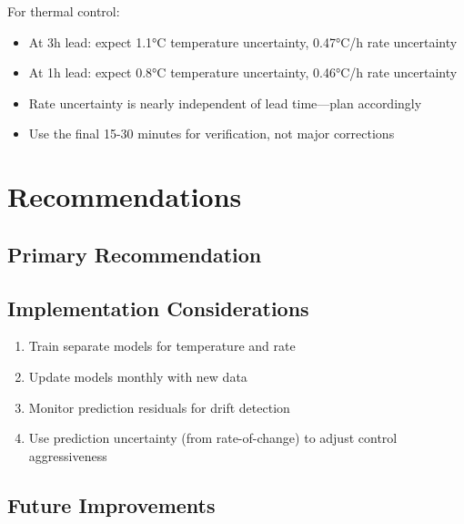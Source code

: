 \documentclass[11pt,letterpaper]{article}
\begin{document}
For thermal control:
\begin{itemize}
    \item At 3h lead: expect 1.1°C temperature uncertainty, 0.47°C/h rate uncertainty
    \item At 1h lead: expect 0.8°C temperature uncertainty, 0.46°C/h rate uncertainty
    \item Rate uncertainty is nearly independent of lead time---plan accordingly
    \item Use the final 15-30 minutes for verification, not major corrections
\end{itemize}

\section{Recommendations}

\subsection{Primary Recommendation}

\begin{center}
\end{center}

\subsection{Implementation Considerations}

\begin{enumerate}
    \item Train separate models for temperature and rate
    \item Update models monthly with new data
    \item Monitor prediction residuals for drift detection
    \item Use prediction uncertainty (from rate-of-change) to adjust control aggressiveness
\end{enumerate}

\subsection{Future Improvements}
\end{document}
